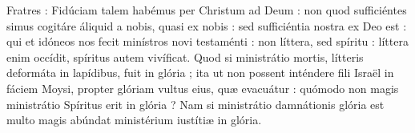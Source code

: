 Fratres : Fidúciam talem habémus per Christum ad Deum : non quod sufficiéntes simus cogitáre áliquid a nobis, quasi ex nobis : sed sufficiéntia nostra ex Deo est : qui et idóneos nos fecit minístros novi testaménti : non líttera, sed spíritu : líttera enim occídit, spíritus autem vivíficat. Quod si ministrátio mortis, lítteris deformáta in lapídibus, fuit in glória ; ita ut non possent inténdere fili Israël in fáciem Moysi, propter glóriam vultus eius, quæ evacuátur : quómodo non magis ministrátio Spíritus erit in glória ? Nam si ministrátio damnátionis glória est multo magis abúndat ministérium iustítiæ in glória.
